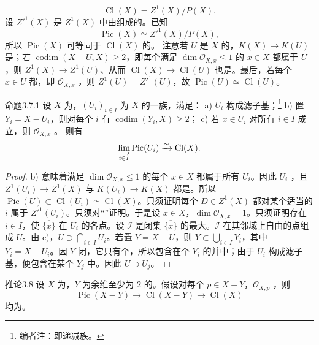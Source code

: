 \[\operatorname{Cl}(X)=Z^1(X)/P(X).\]
设 $Z'^1(X)$ 是 $Z^1(X)$ 中由组成的。已知
\[\operatorname{Pic}(X)\simeq Z'^1(X)/P(X),\]
所以 $\operatorname{Pic}(X)$ 可等同于 $\operatorname{Cl}(X)$ 的。
注意若 $U$ 是 $X$ 的，$K(X)\to K(U)$ 是；若 $\operatorname{codim}(X-U,X)\geq2$，即每个满足 $\dim\mathcal O_{X,x}\leq1$ 的 $x\in X$ 都属于 $U$，则 $Z^1(X)\to Z^1(U)$、从而 $\operatorname{Cl}(X)\to\operatorname{Cl}(U)$ 也是。最后，若每个 $x\in U$ 都，即 $\mathcal O_{X,x}$ ，则 $Z^1(U)=Z'^1(U)$，故 $\operatorname{Pic}(U)\simeq\operatorname{Cl}(U)$。
\begin{SGAresult}{命题}{3.7.1}
设 $X$ 为，$(U_i)_{i\in I}$ 为 $X$ 的一族，满足：
a) $U_i$ 构成滤子基；\footnote{编者注：即递减族。}
b) 置 $Y_i=X-U_i$，则对每个 $i$ 有 $\operatorname{codim}(Y_i,X)\geq2$；
c) 若 $x\in U_i$ 对所有 $i\in I$ 成立，则 $\mathcal O_{X,x}$ 。
则有
\[\varinjlim_{i\in I}\operatorname{Pic}(U_i)\xrightarrow\sim\operatorname{Cl}(X).\]
\end{SGAresult}
\begin{proof}
b) 意味着满足 $\dim\mathcal O_{X,x}\leq1$ 的每个 $x\in X$ 都属于所有 $U_i$。因此 $U_i$ ，且 $Z^1(U_i)\to Z^1(X)$ 与 $K(U_i)\to K(X)$ 都是。所以 $\operatorname{Pic}(U)\subset\operatorname{Cl}(U_i)\simeq\operatorname{Cl}(X)$。只须证明每个 $D\in Z^1(X)$ 都对某个适当的 $i$ 属于 $Z'^1(U_i)$。只须对“”证明。于是设 $x\in X$，$\dim\mathcal O_{X,x}=1$。只须证明存在 $i\in I$，使 $\overline{\{x\}}$ 在 $U_i$ 的各点。设 $\mathcal I$ 是闭集 $\overline{\{x\}}$ 的最大。$\mathcal I$ 在其邻域上自由的点组成 $U$。由 c)，$U\supset\bigcap_{i\in I}U_i$。若置 $Y=X-U$，则 $Y\subset\bigcup_{i\in I}Y_i$，其中 $Y_i=X-U_i$。因 $Y$ 闭，它只有个，所以包含在个 $Y_i$ 的并中；由于 $U_i$ 构成滤子基，便包含在某个 $Y_j$ 中。因此 $U\supset U_j$。
\end{proof}
\begin{SGAresult}{推论}{3.8}
设 $X$ 为，$Y$ 为余维至少为 $2$ 的。假设对每个 $p\in X-Y$，$\mathcal O_{X,p}$ ，则
\[\operatorname{Pic}(X-Y)\longrightarrow\operatorname{Cl}(X-Y)\longrightarrow\operatorname{Cl}(X)\]
均为。
\end{SGAresult}
